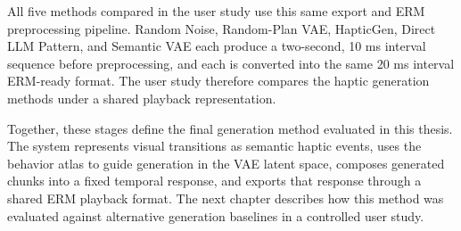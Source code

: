 All five methods compared in the user study use this same export and ERM preprocessing pipeline. Random Noise, Random-Plan VAE, HapticGen, Direct LLM Pattern, and Semantic VAE each produce a two-second, 10 ms interval sequence before preprocessing, and each is converted into the same 20 ms interval ERM-ready format. The user study therefore compares the haptic generation methods under a shared playback representation.

Together, these stages define the final generation method evaluated in this thesis. The system represents visual transitions as semantic haptic events, uses the behavior atlas to guide generation in the VAE latent space, composes generated chunks into a fixed temporal response, and exports that response through a shared ERM playback format. The next chapter describes how this method was evaluated against alternative generation baselines in a controlled user study.
